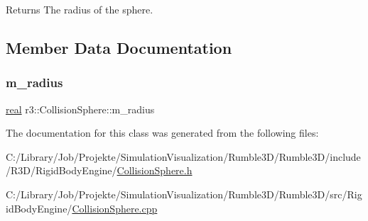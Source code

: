 \begin{DoxyReturn}{Returns}
The radius of the sphere. 
\end{DoxyReturn}


\subsection{Member Data Documentation}
\mbox{\label{classr3_1_1_collision_sphere_abc9e3dcae422b4732a288fa19d89d466}} 
\subsubsection{\texorpdfstring{m\+\_\+radius}{m\_radius}}
{\footnotesize\ttfamily \mbox{\hyperlink{namespacer3_ab2016b3e3f743fb735afce242f0dc1eb}{real}} r3\+::\+Collision\+Sphere\+::m\+\_\+radius\hspace{0.3cm}{\ttfamily [protected]}}



The documentation for this class was generated from the following files\+:\begin{DoxyCompactItemize}
\item 
C\+:/\+Library/\+Job/\+Projekte/\+Simulation\+Visualization/\+Rumble3\+D/\+Rumble3\+D/include/\+R3\+D/\+Rigid\+Body\+Engine/\mbox{\hyperlink{_collision_sphere_8h}{Collision\+Sphere.\+h}}\item 
C\+:/\+Library/\+Job/\+Projekte/\+Simulation\+Visualization/\+Rumble3\+D/\+Rumble3\+D/src/\+Rigid\+Body\+Engine/\mbox{\hyperlink{_collision_sphere_8cpp}{Collision\+Sphere.\+cpp}}\end{DoxyCompactItemize}
